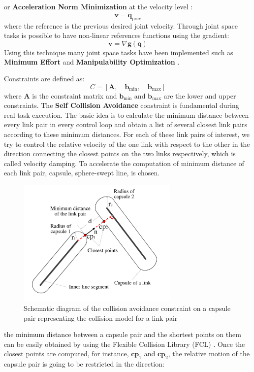 or \textbf{Acceleration Norm Minimization} at the velocity level \cite{Flacco:15}:
\begin{equation}
\mathbf{v} = \mathbf{\dot{q}}_\text{prev}
\end{equation}
where the reference is the previous desired joint velocity.
Through joint space tasks is possible to have non-linear references functions using the gradient:
\begin{equation}
\mathbf{v} = \nabla \mathbf{g(\mathbf{q})}
\end{equation}
Using this technique many joint space tasks have been implemented such as \textbf{Minimum Effort} \cite{RocchiMingoHoffman:15} and \textbf{Manipulability Optimization} \cite{Nakamura:90}. 

Constraints are defined as:
\begin{equation}
    C = \left[ \mathbf{A}, \quad \mathbf{b}_\text{min}, \quad \mathbf{b}_\text{max} \right]
\end{equation}
where $\mathbf{A}$ is the constraint matrix and $\mathbf{b}_\text{min}$ and $\mathbf{b}_\text{max}$ are the lower and upper constraints. The \textbf{Self Collision Avoidance} constraint is fundamental during real task execution. The basic idea is to calculate the minimum distance between every link pair in every control loop and obtain a list of several closest link pairs according to these minimum distances. For each of these link pairs of interest, we try to control the relative velocity of the one link  with respect to the other in the direction connecting the closest points on the two links respectively, which is called velocity damping. To accelerate the computation of minimum distance of each link pair, capsule, sphere-swept  line, is chosen. 
\begin{figure}
  \centering
    \includegraphics[width=0.7\textwidth]{gfx/link_pair}
    \vspace{-50pt}
    \caption{Schematic diagram of the collision avoidance constraint on a capsule pair representing the collision model for a link pair}\label{link_pair}
\end{figure}
the minimum distance between a capsule pair and the shortest points on them can be easily obtained by using the Flexible Collision Library (FCL) \cite{Pan:12}. Once the closest points are computed, for instance, $ \mathbf{cp}_1 $ and $ \mathbf{cp}_2 $, the relative motion of the capsule pair is going to be restricted in the direction:


